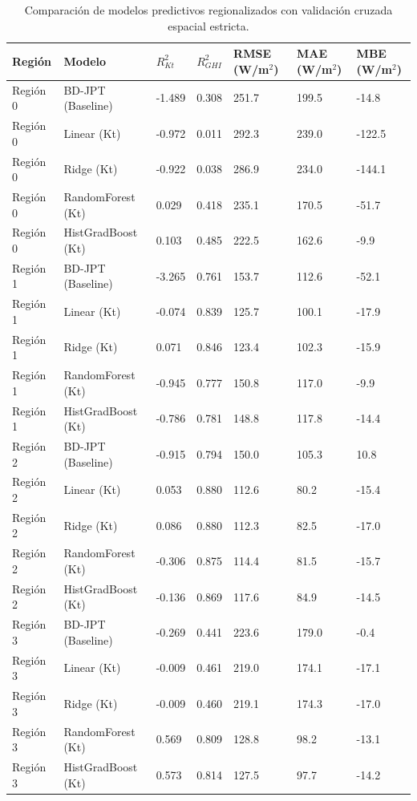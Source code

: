 \begin{table}[htpb]
\centering
\caption{Comparación de modelos predictivos regionalizados con validación cruzada espacial estricta.}
\label{tab:bdjpt_regional_models}
\begin{tabular}{lllllll}
\toprule
Región & Modelo & $R^2_{Kt}$ & $R^2_{GHI}$ & RMSE (W/m$^2$) & MAE (W/m$^2$) & MBE (W/m$^2$) \\
\midrule
Región 0 & BD-JPT (Baseline) & -1.489 & 0.308 & 251.7 & 199.5 & -14.8 \\
Región 0 & Linear (Kt) & -0.972 & 0.011 & 292.3 & 239.0 & -122.5 \\
Región 0 & Ridge (Kt) & -0.922 & 0.038 & 286.9 & 234.0 & -144.1 \\
Región 0 & RandomForest (Kt) & 0.029 & 0.418 & 235.1 & 170.5 & -51.7 \\
Región 0 & HistGradBoost (Kt) & 0.103 & 0.485 & 222.5 & 162.6 & -9.9 \\
Región 1 & BD-JPT (Baseline) & -3.265 & 0.761 & 153.7 & 112.6 & -52.1 \\
Región 1 & Linear (Kt) & -0.074 & 0.839 & 125.7 & 100.1 & -17.9 \\
Región 1 & Ridge (Kt) & 0.071 & 0.846 & 123.4 & 102.3 & -15.9 \\
Región 1 & RandomForest (Kt) & -0.945 & 0.777 & 150.8 & 117.0 & -9.9 \\
Región 1 & HistGradBoost (Kt) & -0.786 & 0.781 & 148.8 & 117.8 & -14.4 \\
Región 2 & BD-JPT (Baseline) & -0.915 & 0.794 & 150.0 & 105.3 & 10.8 \\
Región 2 & Linear (Kt) & 0.053 & 0.880 & 112.6 & 80.2 & -15.4 \\
Región 2 & Ridge (Kt) & 0.086 & 0.880 & 112.3 & 82.5 & -17.0 \\
Región 2 & RandomForest (Kt) & -0.306 & 0.875 & 114.4 & 81.5 & -15.7 \\
Región 2 & HistGradBoost (Kt) & -0.136 & 0.869 & 117.6 & 84.9 & -14.5 \\
Región 3 & BD-JPT (Baseline) & -0.269 & 0.441 & 223.6 & 179.0 & -0.4 \\
Región 3 & Linear (Kt) & -0.009 & 0.461 & 219.0 & 174.1 & -17.1 \\
Región 3 & Ridge (Kt) & -0.009 & 0.460 & 219.1 & 174.3 & -17.0 \\
Región 3 & RandomForest (Kt) & 0.569 & 0.809 & 128.8 & 98.2 & -13.1 \\
Región 3 & HistGradBoost (Kt) & 0.573 & 0.814 & 127.5 & 97.7 & -14.2 \\
\bottomrule
\end{tabular}
\end{table}